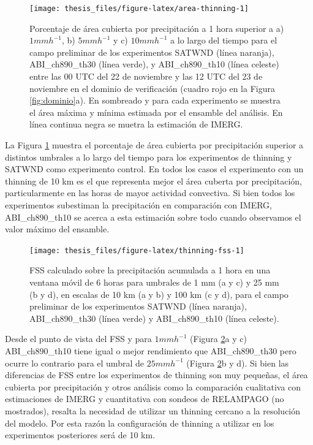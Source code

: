 \documentclass[12pt,oneside,a4paper]{reedthesis}
\begin{document}
\begin{figure}
\texttt{[image: thesis\_files/figure-latex/area-thinning-1]} \caption{Porcentaje de área cubierta por precipitación a 1 hora superior a a) \(1 mmh^{-1}\), b) \(5 mmh^{-1}\) y c) \(10 mmh^{-1}\) a lo largo del tiempo para el campo preliminar de los experimentos SATWND (línea naranja), ABI\_ch890\_th30 (línea verde), y ABI\_ch890\_th10 (línea celeste) entre las 00 UTC del 22 de noviembre y las 12 UTC del 23 de noviembre en el dominio de verificación (cuadro rojo en la Figura \ref{fig:dominio}a). En sombreado y para cada experimento se muestra el área máxima y mínima estimada por el ensamble del análisis. En línea continua negra se muetra la estimación de IMERG.}\label{fig:area-thinning}
\end{figure}
La Figura \ref{fig:area-thinning} muestra el porcentaje de área cubierta por precipitación superior a distintos umbrales a lo largo del tiempo para los experimentos de thinning y SATWND como experimento control. En todos los casos el experimento con un thinning de 10 km es el que representa mejor el área cuberta por precipitación, particularmente en las horas de mayor actividad convectiva. Si bien todos los experimentos subestiman la precipitación en comparación con IMERG, ABI\_ch890\_th10 se acerca a esta estimación sobre todo cuando observamos el valor máximo del ensamble.


\begin{figure}
\texttt{[image: thesis\_files/figure-latex/thinning-fss-1]} \caption{FSS calculado sobre la precipitación acumulada a 1 hora en una ventana móvil de 6 horas para umbrales de 1 mm (a y c) y 25 mm (b y d), en escalas de 10 km (a y b) y 100 km (c y d), para el campo preliminar de los experimentos SATWND (línea naranja), ABI\_ch890\_th30 (línea verde) y ABI\_ch890\_th10 (línea celeste).}\label{fig:thinning-fss}
\end{figure}
Desde el punto de vista del FSS y para \(1 mm h^{-1}\) (Figura \ref{fig:thinning-fss}a y c) ABI\_ch890\_th10 tiene igual o mejor rendimiento que ABI\_ch890\_th30 pero ocurre lo contrario para el umbral de \(25 mm h^{-1}\) (Figura \ref{fig:thinning-fss}b y d). Si bien las diferencias de FSS entre los experimentos de thinning son muy pequeñas, el área cubierta por precipitación y otros análisis como la comparación cualitativa con estimaciones de IMERG y cuantitativa con sondeos de RELAMPAGO (no mostrados), resalta la necesidad de utilizar un thinning cercano a la resolución del modelo. Por esta razón la configuración de thinning a utilizar en los experimentos posteriores será de 10 km.
\end{document}
